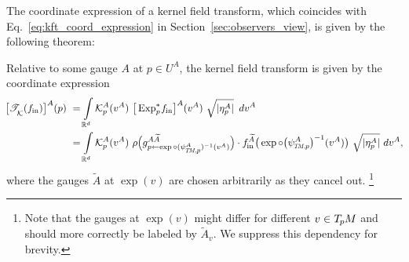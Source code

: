 The coordinate expression of a kernel field transform, which coincides with Eq.~\eqref{eq:kft_coord_expression} in Section~\ref{sec:observers_view}, is given by the following theorem:
\begin{thm}
\label{thm:kernel_field_trafo_in_coords}
    Relative to some gauge $A$ at $p\in U^A$, the kernel field transform is given by the coordinate expression
    \begin{align}\label{eq:kernel_field_trafo_in_coords}
        \!\big[ \TK(\fin) \big]^A (p)
        \ &=
        \int\limits_{\R^d}
        \Kp^A (v^A) \ 
        \big[\Expspfin\big]^A (v^A)
        \ \sqrt{|\eta_p^A|}\,\ dv^A
        \notag \\
        \ &=
        \int\limits_{\R^d}
        \Kp^A (v^A) \ 
        \rho\pig( g^{A\widetilde{A}}_{p\leftarrow\exp\circ (\psiTMp^A)^{-1}(v^A)} \pig)
         \cdot \fin^{\widetilde{A}} \big( \exp \circ \big(\psiTMp^A\big)^{-1} (v^A) \big)
        \ \sqrt{|\eta_p^A|}\ dv^A ,\!
    \end{align}
    where the gauges $\widetilde{A}$ at $\exp(v)$ are chosen arbitrarily as they cancel out.%
    \footnote{
        Note that the gauges at $\exp(v)$ might differ for different $v\in T_{\mkern-1.5mu p}\mkern-.5muM$ and should more correctly be labeled by $\widetilde{A}_v$.
        We suppress this dependency for brevity.
    }
\end{thm}
